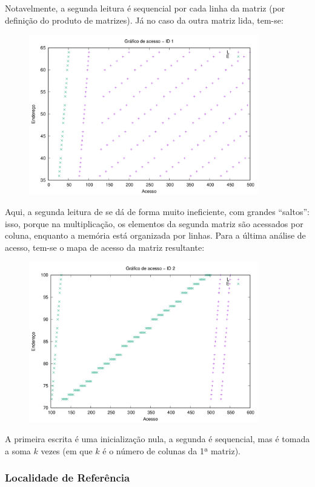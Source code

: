 \documentclass{article}
\begin{document}
Notavelmente, a segunda leitura é sequencial por cada linha da matriz (por definição do produto de matrizes). Já no caso da outra matriz lida, tem-se:

\begin{figure} [H]
    \includegraphics[width=10cm]{m-acesso-1.png} 
    \centering
\end{figure}

Aqui, a segunda leitura de se dá de forma muito ineficiente, com grandes ``saltos'': isso, porque na multiplicação, os elementos da segunda matriz são acessados por coluna, enquanto a memória está organizada por linhas. Para a última análise de acesso, tem-se o mapa de acesso da matriz resultante:

\begin{figure} [H]
    \includegraphics[width=10cm]{m-acesso-2.png} 
    \centering
\end{figure}

A primeira escrita é uma inicialização nula, a segunda é sequencial, mas é tomada a soma \( k \) vezes (em que \( k \) é o número de colunas da 1ª matriz).

\subsubsection{Localidade de Referência}
\end{document}
